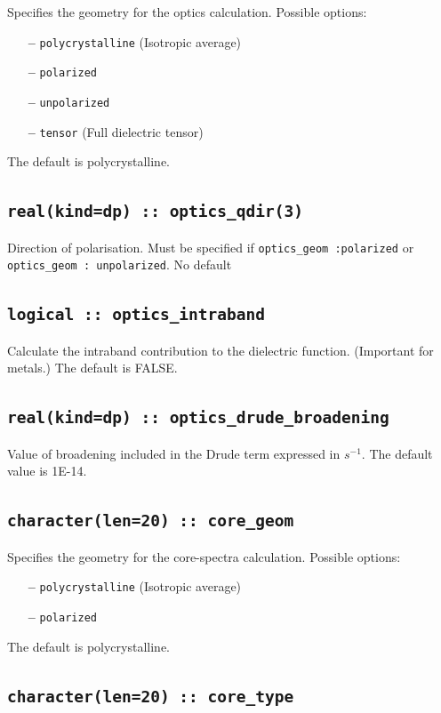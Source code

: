 \documentclass[a4paper,11pt,twoside]{book}
\begin{document}
{Specifies the geometry for the optics calculation.  Possible options:
\begin{itemize}
\item[{\bf --}]  \verb#polycrystalline# (Isotropic average)
\item[{\bf --}]  \verb#polarized#  
\item[{\bf --}]  \verb#unpolarized# 
\item[{\bf --}]  \verb#tensor# (Full dielectric tensor)
\end{itemize}
The default is polycrystalline.

\subsection[optics\_qdir]{\tt real(kind=dp) :: optics\_qdir(3)}
Direction of polarisation. Must be specified if \verb#optics_geom :polarized#  
or \verb#optics_geom : unpolarized#.
No default

\subsection[optics\_intraband]{\tt logical :: optics\_intraband}
Calculate the intraband contribution to the dielectric function.  (Important for metals.)    
The default is FALSE.

\subsection[optics\_drude\_broadening]{\tt real(kind=dp) :: optics\_drude\_broadening}
Value of broadening included in the Drude term expressed in $s^{-1}$.  
The default value is 1E-14.  

\subsection[core\_geom]{\tt character(len=20) :: core\_geom}

Specifies the geometry for the core-spectra calculation.  Possible options: 
\begin{itemize}
\item[{\bf --}]  \verb#polycrystalline# (Isotropic average)
\item[{\bf --}]  \verb#polarized#  
\end{itemize}
The default is polycrystalline.

\subsection[core\_geom]{\tt character(len=20) :: core\_type}

}
\end{document}
